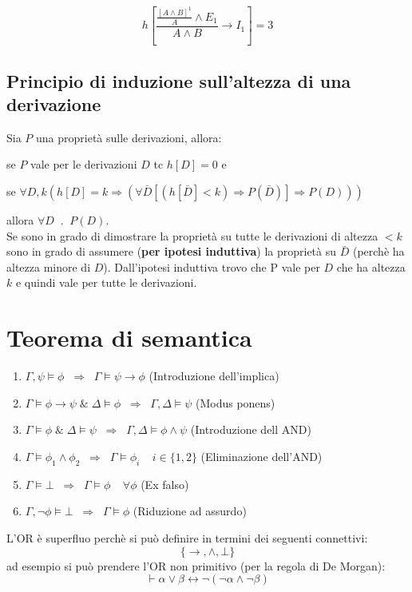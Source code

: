 \documentclass{article}
\theoremstyle{break}
\theoremstyle{break}
\theoremstyle{break}
\theoremstyle{break}
\begin{document}
\begin{exercise}
    \[
        h\left[ \frac{\frac{[A \wedge B]^1}{A}\wedge E_1}{A \wedge B} \to I_1 \right] = 3
    \] 
\end{exercise}

\subsection{Principio di induzione sull'altezza di una derivazione}
Sia \( P \) una proprietà sulle derivazioni, allora:

se \( P \) vale per le derivazioni \( D \) tc \( h[D]=0 \) e

se \( \forall D,k (h[D]=k \Rightarrow (\forall \bar{D}[(h[\bar{D}]<k) \Rightarrow P(\bar{D})] \Rightarrow P(D))) \)

allora \( \forall D\;\; . \;\; P(D) \).\\
Se sono in grado di dimostrare la proprietà su tutte le derivazioni di altezza \( <k \)
sono in grado di assumere (\textbf{per ipotesi induttiva}) la proprietà su \( \bar{D} \)
(perchè ha altezza minore di \( D \)). Dall'ipotesi induttiva trovo che P vale per
\( D \) che ha altezza \( k \) e quindi vale per tutte le derivazioni.


\section{Teorema di semantica}
    \begin{enumerate}
        \item \( \Gamma,\psi \models \phi\;\; \Rightarrow\;\; \Gamma \models \psi \to \phi \) (Introduzione dell'implica)
        \item \( \Gamma \models \phi \to \psi \;\&\; \Delta \models \phi \;\;\Rightarrow\;\; \Gamma,\Delta \models \psi \) (Modus ponens)
        \item \( \Gamma \models \phi \;\&\; \Delta \models \psi \;\;\Rightarrow\;\; \Gamma,\Delta \models \phi \wedge \psi \) (Introduzione dell AND)
        \item \( \Gamma \models \phi_1 \wedge \phi_2 \;\;\Rightarrow\;\; \Gamma \models \phi_i \;\;\;\; i \in \{1,2\}  \) (Eliminazione dell'AND)
        \item \( \Gamma \models \bot \;\;\Rightarrow\;\; \Gamma \models \phi \;\;\;\; \forall \phi \) (Ex falso)
        \item \( \Gamma, \neg \phi \models \bot \;\;\Rightarrow\;\; \Gamma \models \phi \) (Riduzione ad assurdo)
    \end{enumerate}
    L'OR è superfluo perchè si può definire in termini dei seguenti connettivi:
    \[
        \{\to , \wedge, \bot\} 
    \] 
    ad esempio si può prendere l'OR non primitivo (per la regola di De Morgan): \[ \vdash \alpha \vee \beta \leftrightarrow \neg(\neg \alpha \wedge \neg \beta) \] 
\end{document}
